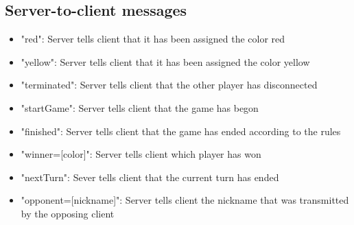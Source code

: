 \documentclass{article}
\begin{document}
    \subsection{Server-to-client messages}
    \begin{itemize}
        \item "red": Server tells client that it has been assigned the color red
        \item "yellow": Server tells client that it has been assigned the color yellow
        \item "terminated": Server tells client that the other player has disconnected
        \item "startGame": Server tells client that the game has begon
        \item "finished": Server tells client that the game has ended according to the rules
        \item "winner=[color]": Server tells client which player has won
        \item "nextTurn": Sever tells client that the current turn has ended
        \item "opponent=[nickname]": Server tells client the nickname that was transmitted by the opposing client
    \end{itemize}
\end{document}
